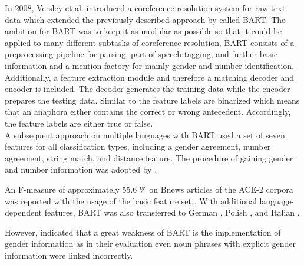In 2008, Versley et al. introduced a coreference resolution system for raw text data which extended the previously described approach by \cite{soon2001machine} called BART. The ambition for BART was to keep it as modular as possible so that it could be applied to many different subtasks of coreference resolution. BART consists of a preprocessing pipeline for parsing, part-of-speech tagging, and further basic information and a mention factory for mainly gender and number identification. Additionally, a feature extraction module and therefore a matching decoder and encoder is included. The decoder generates the training data while the encoder prepares the testing data. Similar to \citep{soon2001machine} the feature labels are binarized which means that an anaphora either contains the correct or wrong antecedent. Accordingly, the feature labels are either true or false. \\
A subsequent approach on multiple languages with BART \citep{broscheit2010bart} used a set of seven features for all classification types, including a gender agreement, number agreement, string match, and distance feature. The procedure of gaining gender and number information was adopted by \cite{soon2001machine}. 

An F-measure of approximately 55.6 \% on Bnews articles of the ACE-2 corpora was reported with the usage of the basic feature set \citep{versley2008bart}. 
With additional language-dependent features, BART was also transferred to German \citep{broscheit2010extending}, Polish \citep{kopec2012creating}, and Italian \citep{poesio2010creating}.

However, \cite{reiteretal:2011b} indicated that a great weakness of BART is the implementation of gender information as in their evaluation even noun phrases with explicit gender information were linked incorrectly.

